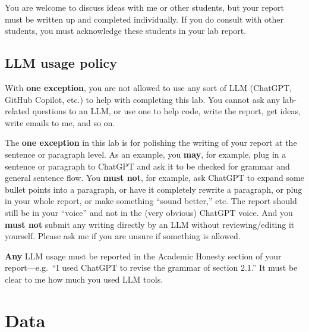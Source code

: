 \documentclass[letterpaper,12pt]{article}
\begin{document}
You are welcome to discuss ideas with me or other students, but your report must be written up and completed individually. If you do consult with other students, you must acknowledge these students in your lab report.

\subsection{LLM usage policy}

With \textbf{one exception}, you are not allowed to use any sort of LLM (ChatGPT, GitHub Copilot, etc.) to help with completing this lab. You cannot ask any lab-related questions to an LLM, or use one to help code, write the report, get ideas, write emails to me, and so on.

The \textbf{one exception} in this lab is for polishing the writing of your report at the sentence or paragraph level. As an example, you \textbf{may}, for example, plug in a sentence or paragraph to ChatGPT and ask it to be checked for grammar and general sentence flow. You \textbf{must not}, for example, ask ChatGPT to expand some bullet points into a paragraph, or have it completely rewrite a paragraph, or plug in your whole report, or make something ``sound better,'' etc. The report should still be in your ``voice'' and not in the (very obvious) ChatGPT voice. And you \textbf{must not} submit any writing directly by an LLM without reviewing/editing it yourself. Please ask me if you are unsure if something is allowed.

\textbf{Any} LLM usage must be reported in the Academic Honesty section of your report---e.g.~``I used ChatGPT to revise the grammar of section 2.1.'' It must be clear to me how much you used LLM tools.

\section{Data}
\end{document}
